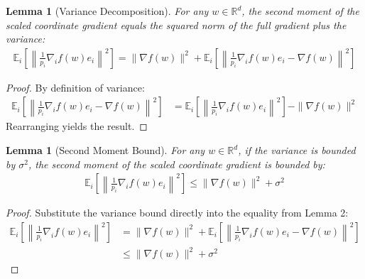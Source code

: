 \documentclass{article}
\newtheorem{lemma}[theorem]{Lemma}
\begin{document}
\begin{lemma}[Variance Decomposition]
For any $w \in \mathbb{R}^d$, the second moment of the scaled coordinate gradient equals the squared norm of the full gradient plus the variance:
\begin{align*}
\mathbb{E}_{i} \left[ \left\| \frac{1}{p_i} \nabla_i f(w) e_i \right\|^2 \right] = \|\nabla f(w)\|^2 + \mathbb{E}_{i} \left[ \left\| \frac{1}{p_i} \nabla_i f(w) e_i - \nabla f(w) \right\|^2 \right]
\end{align*}
\end{lemma}
\begin{proof}
By definition of variance:
\begin{align*}
\mathbb{E}_{i} \left[ \left\| \frac{1}{p_i} \nabla_i f(w) e_i - \nabla f(w) \right\|^2 \right] &= \mathbb{E}_{i} \left[ \left\| \frac{1}{p_i} \nabla_i f(w) e_i \right\|^2 \right] - \|\nabla f(w)\|^2
\end{align*}
Rearranging yields the result.
\end{proof}

\begin{lemma}[Second Moment Bound]
For any $w \in \mathbb{R}^d$, if the variance is bounded by $\sigma^2$, the second moment of the scaled coordinate gradient is bounded by:
\begin{align*}
\mathbb{E}_{i} \left[ \left\| \frac{1}{p_i} \nabla_i f(w) e_i \right\|^2 \right] \leq \|\nabla f(w)\|^2 + \sigma^2
\end{align*}
\end{lemma}
\begin{proof}
Substitute the variance bound directly into the equality from Lemma 2:
\begin{align*}
\mathbb{E}_{i} \left[ \left\| \frac{1}{p_i} \nabla_i f(w) e_i \right\|^2 \right] &= \|\nabla f(w)\|^2 + \mathbb{E}_{i} \left[ \left\| \frac{1}{p_i} \nabla_i f(w) e_i - \nabla f(w) \right\|^2 \right] \\
&\leq \|\nabla f(w)\|^2 + \sigma^2
\end{align*}
\end{proof}
\end{document}
